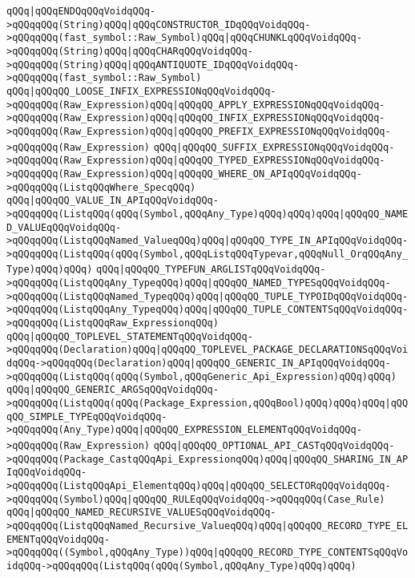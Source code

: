 \verb|qQQq|\verb#|qQQqENDQqQQqVoidqQQq->qQQqqQQq(String)qQQq|qQQqCONSTRUCTOR_IDqQQqVoidqQQq->qQQqqQQq(fast_symbol::Raw_Symbol)qQQq|qQQqCHUNKLqQQqVoidqQQq->qQQqqQQq(String)qQQq|qQQqCHARqQQqVoidqQQq->qQQqqQQq(String)qQQq|qQQqANTIQUOTE_IDqQQqVoidqQQq->qQQqqQQq(fast_symbol::Raw_Symbol)#\newline
\verb|qQQq|\verb#|qQQqQQ_LOOSE_INFIX_EXPRESSIONqQQqVoidqQQq->qQQqqQQq(Raw_Expression)qQQq|qQQqQQ_APPLY_EXPRESSIONqQQqVoidqQQq->qQQqqQQq(Raw_Expression)qQQq|qQQqQQ_INFIX_EXPRESSIONqQQqVoidqQQq->qQQqqQQq(Raw_Expression)qQQq|qQQqQQ_PREFIX_EXPRESSIONqQQqVoidqQQq->qQQqqQQq(Raw_Expression)#\newline
\verb|qQQq|\verb#|qQQqQQ_SUFFIX_EXPRESSIONqQQqVoidqQQq->qQQqqQQq(Raw_Expression)qQQq|qQQqQQ_TYPED_EXPRESSIONqQQqVoidqQQq->qQQqqQQq(Raw_Expression)qQQq|qQQqQQ_WHERE_ON_APIqQQqVoidqQQq->qQQqqQQq(ListqQQqWhere_SpecqQQq)#\newline
\verb|qQQq|\verb#|qQQqQQ_VALUE_IN_APIqQQqVoidqQQq->qQQqqQQq(ListqQQq(qQQq(Symbol,qQQqAny_Type)qQQq)qQQq)qQQq|qQQqQQ_NAMED_VALUEqQQqVoidqQQq->qQQqqQQq(ListqQQqNamed_ValueqQQq)qQQq|qQQqQQ_TYPE_IN_APIqQQqVoidqQQq->qQQqqQQq(ListqQQq(qQQq(Symbol,qQQqListqQQqTypevar,qQQqNull_OrqQQqAny_Type)qQQq)qQQq)#\newline
\verb|qQQq|\verb#|qQQqQQ_TYPEFUN_ARGLISTqQQqVoidqQQq->qQQqqQQq(ListqQQqAny_TypeqQQq)qQQq|qQQqQQ_NAMED_TYPESqQQqVoidqQQq->qQQqqQQq(ListqQQqNamed_TypeqQQq)qQQq|qQQqQQ_TUPLE_TYPOIDqQQqVoidqQQq->qQQqqQQq(ListqQQqAny_TypeqQQq)qQQq|qQQqQQ_TUPLE_CONTENTSqQQqVoidqQQq->qQQqqQQq(ListqQQqRaw_ExpressionqQQq)#\newline
\verb|qQQq|\verb#|qQQqQQ_TOPLEVEL_STATEMENTqQQqVoidqQQq->qQQqqQQq(Declaration)qQQq|qQQqQQ_TOPLEVEL_PACKAGE_DECLARATIONSqQQqVoidqQQq->qQQqqQQq(Declaration)qQQq|qQQqQQ_GENERIC_IN_APIqQQqVoidqQQq->qQQqqQQq(ListqQQq(qQQq(Symbol,qQQqGeneric_Api_Expression)qQQq)qQQq)#\newline
\verb|qQQq|\verb#|qQQqQQ_GENERIC_ARGSqQQqVoidqQQq->qQQqqQQq(ListqQQq(qQQq(Package_Expression,qQQqBool)qQQq)qQQq)qQQq|qQQqQQ_SIMPLE_TYPEqQQqVoidqQQq->qQQqqQQq(Any_Type)qQQq|qQQqQQ_EXPRESSION_ELEMENTqQQqVoidqQQq->qQQqqQQq(Raw_Expression)#\newline
\verb|qQQq|\verb#|qQQqQQ_OPTIONAL_API_CASTqQQqVoidqQQq->qQQqqQQq(Package_CastqQQqApi_ExpressionqQQq)qQQq|qQQqQQ_SHARING_IN_APIqQQqVoidqQQq->qQQqqQQq(ListqQQqApi_ElementqQQq)qQQq|qQQqQQ_SELECTORqQQqVoidqQQq->qQQqqQQq(Symbol)qQQq|qQQqQQ_RULEqQQqVoidqQQq->qQQqqQQq(Case_Rule)#\newline
\verb|qQQq|\verb#|qQQqQQ_NAMED_RECURSIVE_VALUESqQQqVoidqQQq->qQQqqQQq(ListqQQqNamed_Recursive_ValueqQQq)qQQq|qQQqQQ_RECORD_TYPE_ELEMENTqQQqVoidqQQq->qQQqqQQq((Symbol,qQQqAny_Type))qQQq|qQQqQQ_RECORD_TYPE_CONTENTSqQQqVoidqQQq->qQQqqQQq(ListqQQq(qQQq(Symbol,qQQqAny_Type)qQQq)qQQq)#\newline
